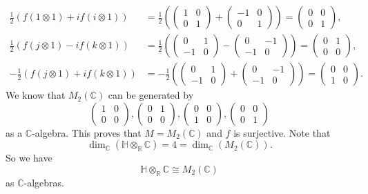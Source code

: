 \documentclass[a4paper, 12pt]{article}
\begin{document}
\begin{solution}
\begin{align*}
	\frac{1}{2}(f(1\otimes 1)+if(i\otimes 1))&=\frac{1}{2}(\begin{pmatrix}
		1&0\\ 
		0&1
	\end{pmatrix}+\begin{pmatrix}
		-1&0\\ 
		0&1
	\end{pmatrix})=\begin{pmatrix}
		0&0\\
		0&1
	\end{pmatrix},\\ 
	\frac{1}{2}(f(j\otimes 1)-if(k\otimes 1))&=\frac{1}{2}(\begin{pmatrix}
		0&1\\ 
		-1&0
	\end{pmatrix}-\begin{pmatrix}
		0&-1\\ 
		-1&0
	\end{pmatrix})=\begin{pmatrix}
		0&1\\
		0&0
	\end{pmatrix},\\[5pt]
	-\frac{1}{2}(f(j\otimes 1)+if(k\otimes 1))&=-\frac{1}{2}(\begin{pmatrix}
		0&1\\ 
		-1&0
	\end{pmatrix}+\begin{pmatrix}
		0&-1\\ 
		-1&0
	\end{pmatrix})=\begin{pmatrix}
		0&0\\
		1&0
	\end{pmatrix}. 
\end{align*}
We know that \(M_2(\mathbb{C})\) can be generated by 
\[\begin{pmatrix}
	1&0\\
	0&0
\end{pmatrix},\begin{pmatrix}
	0&1\\
	0&0
\end{pmatrix},\begin{pmatrix}
	0&0\\
	1&0
\end{pmatrix},\begin{pmatrix}
	0&0\\
	0&1
\end{pmatrix}\]
as a \(\mathbb{C}\)-algebra. This proves that \(M=M_2(\mathbb{C})\) and \(f\) is surjective. Note that 
\[\dim_\mathbb{C}(\mathbb{H}\otimes_\mathbb{R}\mathbb{C})=4=\dim_\mathbb{C}(M_2(\mathbb{C})).\]
So we have 
\[\mathbb{H}\otimes_\mathbb{R}\mathbb{C}\cong M_2(\mathbb{C})\]
as \(\mathbb{C}\)-algebras.
\end{solution}
\end{document}
